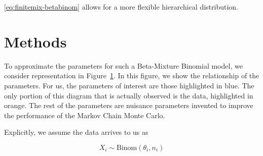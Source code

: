 \documentclass{article}
\begin{document}
\eqref{eq:finitemix-betabinom} allows for a more flexible hierarchical distribution. 
\newpage

\section{Methods}

To approximate the parameters for such a Beta-Mixture Binomial model, we consider representation in Figure~\ref{fig:diagram}. In this figure, we show the relationship of the parameters. For us, the parameters of interest are those highlighted in {\color{blue}blue}. The only portion of this diagram that is actually observed is the data, highlighted in {\color{orange}orange}. The rest of the parameters are nuisance parameters invented to improve the performance of the Markov Chain Monte Carlo. \\

\begin{figure}[H]
\centering
{}
\label{fig:diagram}
\end{figure}

Explicitly, we assume the data arrives to us as

\begin{equation}\label{eq:data}
    X_i \sim \text{Binom}(\theta_i, n_i)
\end{equation}
\end{document}
